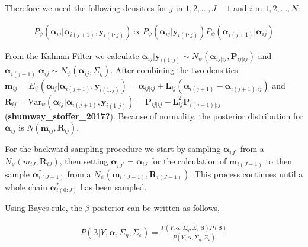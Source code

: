 \documentclass[
]{article}
\begin{document}
Therefore we need the following densities for \(j\) in \(1, 2, ..., J-1\) and \(i\) in \(1, 2, ..., N\):

\begin{equation*}
\begin{aligned}
P_\psi(\boldsymbol{\alpha}_{ij}|\boldsymbol{\alpha}_{i(j+1)}, \boldsymbol{y}_{i(1:j)}) \propto P_\psi(\boldsymbol{\alpha}_{ij}| \boldsymbol{y}_{i(1:j)})P_\psi(\boldsymbol{\alpha}_{i(j+1)}| \boldsymbol{\alpha}_{ij})
\end{aligned}
\end{equation*}

From the Kalman Filter we calculate \(\boldsymbol{\alpha}_{ij}|\boldsymbol{y}_{i(1:j)} \sim N_\psi(\boldsymbol{\alpha}_{ij|ij}, \boldsymbol{P}_{ij|ij})\) and \(\boldsymbol{\alpha}_{i(j+1)}|\boldsymbol{\alpha}_{ij} \sim N_\psi(\boldsymbol{\alpha}_{ij}, \Sigma_\eta)\). After combining the two densities \(\boldsymbol{m}_{ij} = E_\psi(\boldsymbol{\alpha}_{ij}| \boldsymbol{\alpha}_{i(j+1)},\boldsymbol{y}_{i(1:j)}) = \boldsymbol{\alpha}_{ij|ij} + \boldsymbol{L}_{ij} (\boldsymbol{\alpha}_{i(j+1)} - \boldsymbol{\alpha}_{i(j+1)|ij})\) and \(\boldsymbol{R}_{ij} = \text{Var}_\psi(\boldsymbol{\alpha}_{ij}| \boldsymbol{\alpha}_{i(j+1)},\boldsymbol{y}_{i(1:j)})= \boldsymbol{P}_{ij|ij} - \boldsymbol{L}_{ij}^2 \boldsymbol{P}_{i(j+1)|ij}\) (\textbf{shumway\_stoffer\_2017?}). Because of normality, the posterior distribution for \(\boldsymbol{\alpha}_{ij}\) is \(N(\boldsymbol{m}_{ij}, \boldsymbol{R}_{ij})\).

For the backward sampling procedure we start by sampling \(\boldsymbol{\alpha}_{iJ^*}\) from a \(N_\psi(m_{iJ}, \boldsymbol{R}_{iJ})\), then setting \(\boldsymbol{\alpha}_{iJ^*} = \boldsymbol{\alpha}_{iJ}\) for the calculation of \(\boldsymbol{m}_{i(J-1)}\) to then sample \(\boldsymbol{\alpha}_{i(J-1)}^*\) from a \(N_\psi(\boldsymbol{m}_{i(J-1)}, \boldsymbol{R}_{i(J-1)})\). This process continues until a whole chain \(\boldsymbol{\alpha}_{i(0:J)}^*\) has been sampled.

Using Bayes rule, the \(\beta\) posterior can be written as follows,

\begin{equation*}
\begin{aligned}
P(\boldsymbol{\beta}|Y, \boldsymbol{\alpha}, \Sigma_\eta, \Sigma_\varepsilon) = \frac{P(Y, \boldsymbol{\alpha}, \Sigma_\eta, \Sigma_\varepsilon|\boldsymbol{\beta})P(\boldsymbol{\beta})}{P(Y, \boldsymbol{\alpha}, \Sigma_\eta, \Sigma_\varepsilon)}
\end{aligned}
\end{equation*}
\end{document}
